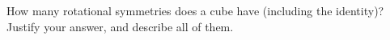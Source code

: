 How many rotational symmetries does a cube have (including the identity)? Justify your answer, and describe all of them.
